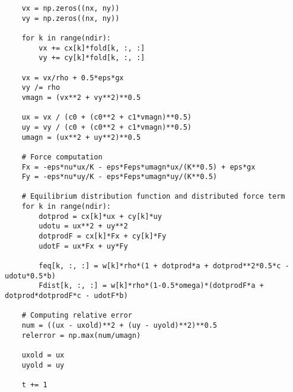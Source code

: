 \begin{mdframed}[backgroundcolor=red!10, linecolor=red!10]
\begin{verbatim}
    vx = np.zeros((nx, ny))
    vy = np.zeros((nx, ny))

    for k in range(ndir):
        vx += cx[k]*fold[k, :, :] 
        vy += cy[k]*fold[k, :, :] 

    vx = vx/rho + 0.5*eps*gx 
    vy /= rho
    vmagn = (vx**2 + vy**2)**0.5

    ux = vx / (c0 + (c0**2 + c1*vmagn)**0.5)
    uy = vy / (c0 + (c0**2 + c1*vmagn)**0.5)
    umagn = (ux**2 + uy**2)**0.5
    
    # Force computation
    Fx = -eps*nu*ux/K - eps*Feps*umagn*ux/(K**0.5) + eps*gx
    Fy = -eps*nu*uy/K - eps*Feps*umagn*uy/(K**0.5)

    # Equilibrium distribution function and distributed force term
    for k in range(ndir):
        dotprod = cx[k]*ux + cy[k]*uy
        udotu = ux**2 + uy**2
        dotprodF = cx[k]*Fx + cy[k]*Fy
        udotF = ux*Fx + uy*Fy
        
        feq[k, :, :] = w[k]*rho*(1 + dotprod*a + dotprod**2*0.5*c - udotu*0.5*b)
        Fdist[k, :, :] = w[k]*rho*(1-0.5*omega)*(dotprodF*a + dotprod*dotprodF*c - udotF*b) 
        
    # Computing relative error
    num = ((ux - uxold)**2 + (uy - uyold)**2)**0.5
    relerror = np.max(num/umagn)
    
    uxold = ux
    uyold = uy

    t += 1
\end{verbatim}
\end{mdframed}